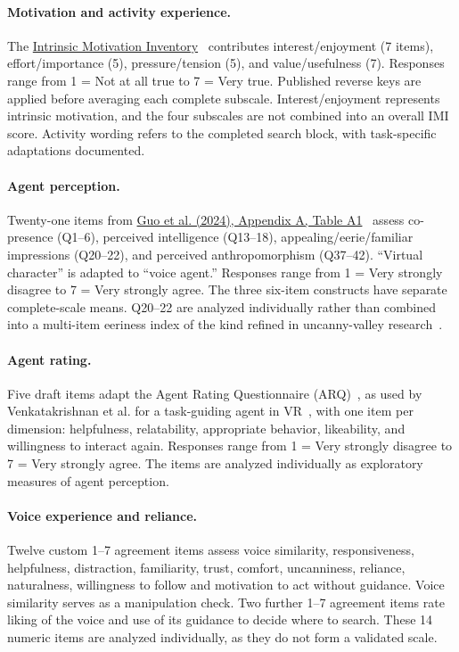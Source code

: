 \paragraph{Motivation and activity experience.} The \href{https://selfdeterminationtheory.org/intrinsic-motivation-inventory/}{Intrinsic Motivation Inventory}~\cite{ryan1982control,mcauley1989imi} contributes interest/enjoyment (7 items), effort/importance (5), pressure/tension (5), and value/usefulness (7). Responses range from 1 = Not at all true to 7 = Very true. Published reverse keys are applied before averaging each complete subscale. Interest/enjoyment represents intrinsic motivation, and the four subscales are not combined into an overall IMI score. Activity wording refers to the completed search block, with task-specific adaptations documented.

\paragraph{Agent perception.} Twenty-one items from \href{https://doi.org/10.1145/3651288}{Guo et al. (2024), Appendix A, Table A1}~\cite{guo2024doppelganger} assess co-presence (Q1--6), perceived intelligence (Q13--18), appealing/eerie/familiar impressions (Q20--22), and perceived anthropomorphism (Q37--42). ``Virtual character'' is adapted to ``voice agent.'' Responses range from 1 = Very strongly disagree to 7 = Very strongly agree. The three six-item constructs have separate complete-scale means. Q20--22 are analyzed individually rather than combined into a multi-item eeriness index of the kind refined in uncanny-valley research~\cite{homacdorman2017eeriness}.

\paragraph{Agent rating.} Five draft items adapt the Agent Rating Questionnaire (ARQ)~\cite{wang2020terrible}, as used by Venkatakrishnan et al. for a task-guiding agent in VR~\cite{venkatakrishnan2026clarifying}, with one item per dimension: helpfulness, relatability, appropriate behavior, likeability, and willingness to interact again. Responses range from 1 = Very strongly disagree to 7 = Very strongly agree. The items are analyzed individually as exploratory measures of agent perception.

\paragraph{Voice experience and reliance.} Twelve custom 1--7 agreement items assess voice similarity, responsiveness, helpfulness, distraction, familiarity, trust, comfort, uncanniness, reliance, naturalness, willingness to follow and motivation to act without guidance. Voice similarity serves as a manipulation check. Two further 1--7 agreement items rate liking of the voice and use of its guidance to decide where to search. These 14 numeric items are analyzed individually, as they do not form a validated scale.


